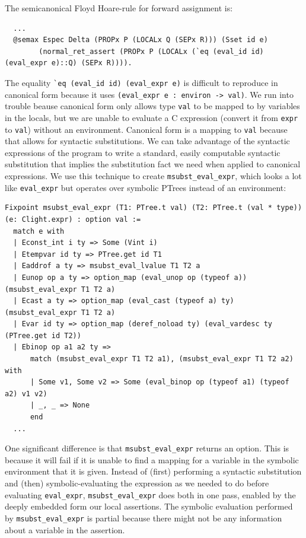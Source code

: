 \documentclass{puthesis}
\begin{document}
The semicanonical Floyd Hoare-rule for forward assignment is:
\pagebreak
\begin{lstlisting}
  ...
  @semax Espec Delta (PROPx P (LOCALx Q (SEPx R))) (Sset id e) 
        (normal_ret_assert (PROPx P (LOCALx (`eq (eval_id id) (eval_expr e)::Q) (SEPx R)))).
\end{lstlisting}

The equality \lstinline|`eq (eval_id id) (eval_expr e)| is difficult to
reproduce in canonical form because it uses 
\lstinline|(eval_expr e : environ -> val)|. 
We run into trouble beause canonical form only
allows type \lstinline|val| to be mapped to by variables in the
locals, but we are unable to evaluate a C expression (convert it from
\lstinline|expr| to \lstinline|val|) without an environment. Canonical
form is a mapping to \lstinline|val| because that allows for syntactic
substitutions. We can take advantage of the syntactic expressions of
the program to write a standard, easily computable syntactic
substitution that implies the substitution fact we need when applied
to canonical expressions. We use this technique to create
\lstinline|msubst_eval_expr|, which looks a lot like
\lstinline|eval_expr| but operates over symbolic PTrees instead of an
environment:

\begin{lstlisting}
Fixpoint msubst_eval_expr (T1: PTree.t val) (T2: PTree.t (val * type)) (e: Clight.expr) : option val :=
  match e with
  | Econst_int i ty => Some (Vint i)
  | Etempvar id ty => PTree.get id T1
  | Eaddrof a ty => msubst_eval_lvalue T1 T2 a 
  | Eunop op a ty => option_map (eval_unop op (typeof a)) (msubst_eval_expr T1 T2 a) 
  | Ecast a ty => option_map (eval_cast (typeof a) ty) (msubst_eval_expr T1 T2 a)
  | Evar id ty => option_map (deref_noload ty) (eval_vardesc ty (PTree.get id T2))
  | Ebinop op a1 a2 ty =>
      match (msubst_eval_expr T1 T2 a1), (msubst_eval_expr T1 T2 a2) with
      | Some v1, Some v2 => Some (eval_binop op (typeof a1) (typeof a2) v1 v2) 
      | _, _ => None
      end
  ...
\end{lstlisting}

One significant difference is that \lstinline|msubst_eval_expr| returns
an option. This is because it will fail if it is unable to find a
mapping for a variable in the symbolic environment that it is
given. Instead of (first) performing a
syntactic substitution and (then) symbolic-evaluating the expression
as we needed to do before evaluating \lstinline|eval_expr|,
\lstinline|msubst_eval_expr| does both in one pass, enabled by the
deeply embedded form our local assertions.  The symbolic evaluation
performed by \lstinline|msubst_eval_expr| is partial because there
might not be any information about a variable in the assertion.
\end{document}
